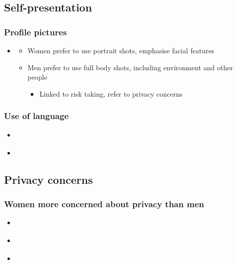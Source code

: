 \subsection{Self-presentation}

\subsubsection{Profile pictures}
\begin{itemize}
\item \citet{Haferkamp2012}
	\begin{itemize}
	\item Women prefer to use portrait shots, emphasise facial features
	\item Men prefer to use full body shots, including environment and other people
		\begin{itemize}
		\item Linked to risk taking, refer to privacy concerns
		\end{itemize}
	\end{itemize}
\end{itemize}

\subsubsection{Use of language}
\begin{itemize}
\item \citet{Schwartz2013}
\item \citet{Joiner2014}
\end{itemize}

\subsection{Privacy concerns}

\subsubsection{Women more concerned about privacy than men}
\begin{itemize}
\item \citet{Mathiyalakan2014}
\item \citet{Raacke2008}
\item \citet{Fogel2009}
\end{itemize}